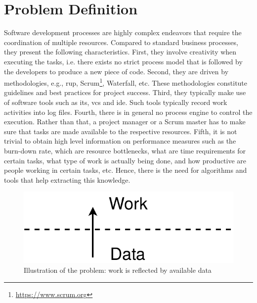 \documentclass[a4paper,11pt]{article}
\begin{document}


%




%
%

\section{Problem Definition}
\label{sec:problem-definition}

Software development processes are highly complex endeavors that require the coordination of multiple resources. Compared to standard business processes, they present the following characteristics. First, 
they involve creativity when executing the tasks, i.e. there exists no strict process model that is followed by the developers to produce a new piece of code. Second, they are driven by methodologies, e.g., \gls{rup}, Scrum\footnote{\url{https://www.scrum.org}}, Waterfall, etc. These methodologies constitute guidelines and best practices for project success. Third, they typically make use of software tools such as \gls{its}, \gls{vcs} and \gls{ide}. Such tools typically record work activities into log files. Fourth, there is in general no process engine to control the execution. Rather than that, a project manager or a Scrum master has to make sure that tasks are made available to the respective resources. Fifth, it is not trivial to obtain high level information on performance measures such as the burn-down rate, which are resource bottlenecks, what are time requirements for certain tasks, what type of work is actually being done, and how productive are people working in certain tasks, etc. Hence, there is the need for algorithms and tools that help extracting this knowledge.

\begin{figure}
	\centering
	\includegraphics[width=0.5\linewidth]{figures/data-to-work}
	\caption{Illustration of the problem: work is reflected by available data}
	\label{fig:data-to-work}
\end{figure}
\end{document}
